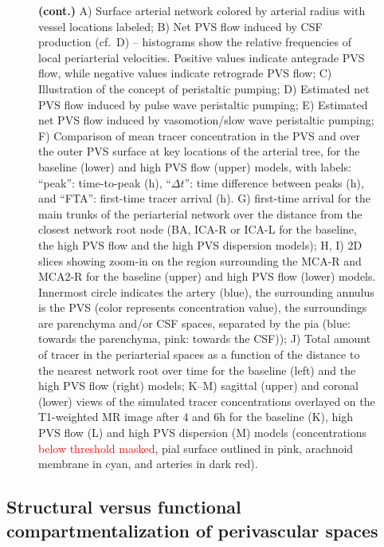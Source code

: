 \documentclass[fleqn,10pt]{wlscirep}
\newcommand{\mer}[1]{\textcolor{magenta}{#1}}
\newcommand{\discuss}[1]{\textcolor{red}{#1}}
\begin{document}
\begin{figure}
\ContinuedFloat
  \caption{\textbf{(cont.)}
    A) Surface arterial network colored by arterial radius with vessel locations labeled;
    B) Net PVS flow induced by CSF production (cf.~D) -- histograms show the relative frequencies of local periarterial velocities. Positive values indicate antegrade PVS flow, while negative values indicate retrograde PVS flow;
    C) Illustration of the concept of peristaltic pumping;
    D) Estimated net PVS flow induced by pulse wave peristaltic pumping;
    E) Estimated net PVS flow induced by vasomotion/slow wave peristaltic pumping;
    F) Comparison of mean tracer concentration in the PVS and over the outer PVS surface at key locations of the arterial tree, for the baseline (lower) and high PVS flow (upper) models, with labels: ``peak'': time-to-peak (h), ``$\Delta t$'': time difference between peaks (h), and ``FTA'': first-time tracer arrival (h).
    G) first-time arrival for the main trunks of the periarterial network over the distance from the closest network root node (BA, ICA-R or ICA-L for the baseline, the high PVS flow and the high PVS dispersion models);
    H, I) 2D slices showing zoom-in on the region surrounding the MCA-R and MCA2-R for the baseline (upper) and high PVS flow (lower) models. Innermost circle indicates the artery (blue), the surrounding annulus is the PVS (color represents concentration value), the surroundings are parenchyma and/or CSF spaces, separated by the pia (blue: towards the parenchyma, pink: towards the CSF));
    J) Total amount of tracer in the periarterial spaces as a function of the distance to the nearest network root over time for the baseline (left) and the high PVS flow (right) models;
    K--M) sagittal (upper) and coronal (lower) views of the simulated tracer concentrations overlayed on the T1-weighted MR image after 4 and 6h for the baseline (K), high PVS flow (L) and high PVS dispersion (M) models (concentrations \discuss{below threshold masked}, pial surface outlined in pink, arachnoid membrane in cyan, and arteries in dark red).}
\end{figure}

\subsection*{Structural versus functional compartmentalization of perivascular spaces}
\end{document}
